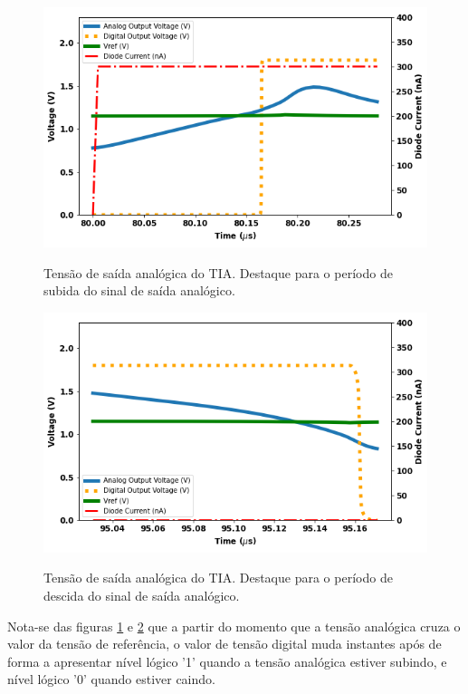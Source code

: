 \begin{figure}[!h]
 \centering
    \caption{Tensão de saída analógica do TIA. Destaque para o período de subida do sinal de saída analógico.} 
    \includegraphics[scale=0.5]{Resultados/Graficos/tb_clock_vref.png}
    \label{graf_tiasinal2}
\end{figure}

\begin{figure}[!h]
 \centering
    \caption{Tensão de saída analógica do TIA. Destaque para o período de descida do sinal de saída analógico.}
    \includegraphics[scale=0.5]{Resultados/Graficos/tb_clock_vref2.png}
    \label{graf_tiasinal3}
\end{figure}

Nota-se das figuras \ref{graf_tiasinal2} e \ref{graf_tiasinal3} que a partir do momento que a tensão analógica cruza o valor da tensão de referência, o valor de tensão digital muda instantes após de forma a apresentar nível lógico '1' quando a tensão analógica estiver subindo, e nível lógico '0' quando estiver caindo.